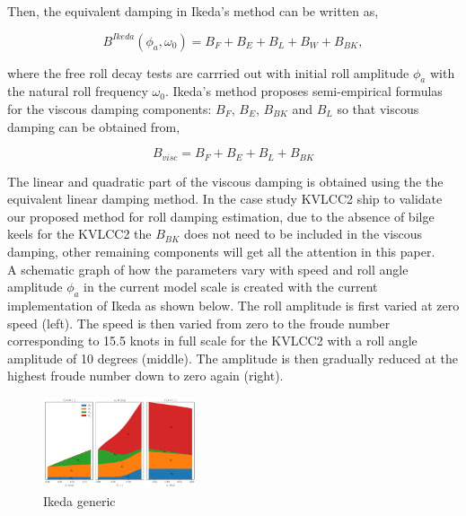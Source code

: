 Then, the equivalent damping in Ikeda's method can be written as,


\begin{equation}
    B^{Ikeda}(\phi_a, \omega_0) = B_F + B_E + B_L + B_W + B_{BK},
\end{equation}

where the free roll decay tests are carrried out with initial roll amplitude $\phi_a$ with the natural roll frequency $\omega_0$.
Ikeda's method proposes semi-empirical formulas for the viscous damping components: $B_F$, $B_E$, $B_{BK}$ and $B_L$ so that viscous damping can be obtained from,

\begin{equation}
\label{eq:viscous damping}
B_{visc} = B_F + B_E + B_L + B_{BK}
\end{equation}

The linear and quadratic part of the viscous damping is obtained using the the equivalent linear damping method. In the case study KVLCC2 ship to validate our proposed method for roll damping estimation, due to the absence of bilge keels for the KVLCC2 the $B_{BK}$ does not need to be included in the viscous damping, other remaining components will get all the attention in this paper. \\

A schematic graph of how the parameters vary with speed and roll angle amplitude $\phi_a$ in the current model scale is created with the current implementation of Ikeda as shown below. The roll amplitude is first varied at zero speed (left). The speed is then varied from zero to the froude number corresponding to 15.5 knots in full scale for the KVLCC2 with a roll angle amplitude of 10 degrees (middle). The amplitude is then gradually reduced at the highest froude number down to zero again (right).
\pagebreak

\begin{figure}[H]
    \begin{center}\includegraphics[width = 0.4\textwidth]{figures/ikeda_generic.pdf}\end{center}
    \vspace{-1cm}
    \caption{Ikeda generic}
    \label{fig:ikeda_generic}
\end{figure}

